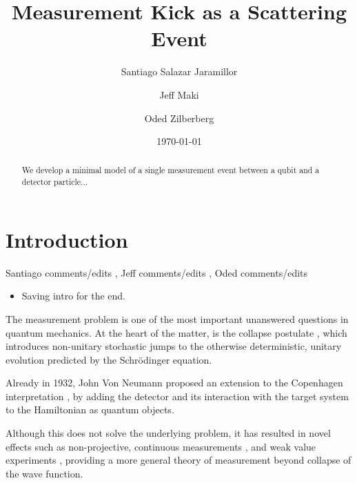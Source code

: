 \documentclass[10pt,
 amsmath,amssymb,
 aps,prb, twocolumn
]{revtex4-2}
\begin{document}
\newcommand{\id}{\mathds{1}}
\newcommand\sj[1]{ {\color{cyan} #1} } 
\newcommand\jm[1]{ {\color{magenta} #1} } 
\newcommand\oz[1]{ {\color{mediumgreen} #1} } 

\title{Measurement Kick as a Scattering Event}

\author{Santiago Salazar Jaramillor}
\author{Jeff Maki}

\author{Oded Zilberberg}


\date{\today}

\begin{abstract}
    We develop a minimal model of a single measurement event between a qubit and a detector particle...
\end{abstract}

\maketitle

\section{Introduction}\label{sect:introduction}

\sj{Santiago comments/edits}, \jm{Jeff comments/edits}, \oz{Oded comments/edits}\\

\begin{itemize}
    \item Saving intro for the end.
\end{itemize}

The measurement problem is one of the most important unanswered questions in quantum mechanics. At the heart of the matter, is the collapse postulate \cite{wigner1995}, which introduces non-unitary stochastic jumps to the otherwise deterministic, unitary evolution predicted by the Schrödinger equation.

Already in 1932, John Von Neumann proposed an extension to the Copenhagen interpretation \cite{vonNeumann1932}, by adding the detector and its interaction with the target system to the Hamiltonian as quantum objects. 

Although this does not solve the underlying problem, it has resulted in novel effects such as non-projective, continuous measurements \cite{tamir013}, and weak value experiments \cite{aharonov1988, alonso2005}, providing a more general theory of measurement beyond collapse of the wave function. 
\end{document}

